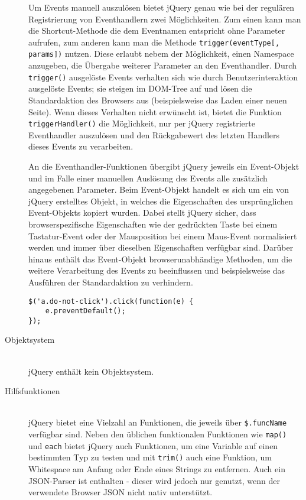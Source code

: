 \begin{description}
Um Events manuell auszulösen bietet jQuery genau wie bei der regulären Registrierung von
Eventhandlern zwei Möglichkeiten. Zum einen kann man die Shortcut-Methode die dem Eventnamen
entspricht ohne Parameter aufrufen, zum anderen kann man die Methode
\lstinline{trigger(eventType[, params])} nutzen. Diese erlaubt nebem der Möglichkeit, einen Namespace
anzugeben, die Übergabe weiterer Parameter an den Eventhandler. Durch \lstinline{trigger()}
ausgelöste Events verhalten sich wie durch Benutzerinteraktion ausgelöste Events; sie steigen im
DOM-Tree auf und lösen die Standardaktion des Browsers aus (beispielsweise das Laden einer neuen
Seite). Wenn dieses Verhalten nicht erwünscht ist, bietet die Funktion \lstinline{triggerHandler()}
die Möglichkeit, nur per jQuery registrierte Eventhandler auszulösen und den Rückgabewert des
letzten Handlers dieses Events zu verarbeiten.

An die Eventhandler-Funktionen übergibt jQuery jeweils ein Event-Objekt und im Falle einer manuellen
Auslösung des Events alle zusätzlich angegebenen Parameter. Beim Event-Objekt handelt es
sich um ein von jQuery erstelltes Objekt, in welches die Eigenschaften des ursprünglichen
Event-Objekts kopiert wurden. Dabei stellt jQuery sicher, dass browserspezifische Eigenschaften wie
der gedrückten Taste bei einem Tastatur-Event oder der Mausposition bei einem Maus-Event
normalisiert werden und immer über dieselben Eigenschaften verfügbar sind. Darüber hinaus enthält das
Event-Objekt browserunabhändige Methoden, um die weitere Verarbeitung des Events zu beeinflussen und
beispielsweise das Ausführen der Standardaktion zu verhindern.

\begin{lstlisting}[caption=Blockieren des Click-Events einiger Links via jQuery]
$('a.do-not-click').click(function(e) {
    e.preventDefault();
});
\end{lstlisting}

\item[Objektsystem] \hfill \\
jQuery enthält kein Objektsystem.

\item[Hilfsfunktionen] \hfill \\
jQuery bietet eine Vielzahl an Funktionen, die jeweils über \lstinline{$.funcName} verfügbar sind.
Neben den üblichen funktionalen Funktionen wie \lstinline{map()} und \lstinline{each} bietet jQuery
auch Funktionen, um eine Variable auf einen bestimmten Typ zu testen und mit \lstinline{trim()} auch
eine Funktion, um Whitespace am Anfang oder Ende eines Strings zu entfernen. Auch ein JSON-Parser
ist enthalten - dieser wird jedoch nur genutzt, wenn der verwendete Browser JSON nicht nativ
unterstützt.


\end{description}

